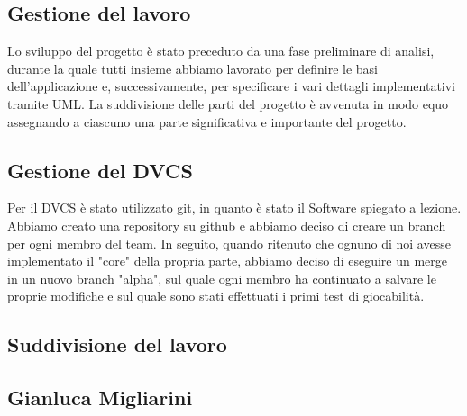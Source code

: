 \documentclass[a4paper,12pt]{report}
\begin{document}
\subsection{Gestione del lavoro}
Lo sviluppo del progetto è stato preceduto da una fase preliminare di analisi, durante la quale tutti insieme abbiamo lavorato per definire le basi dell'applicazione e, successivamente, per specificare i vari dettagli implementativi tramite UML.
La suddivisione delle parti del progetto è avvenuta in modo equo assegnando a ciascuno una parte significativa e importante del progetto.
\subsection*{Gestione del DVCS}
Per il DVCS è stato utilizzato git, in quanto è stato il Software spiegato a lezione. Abbiamo creato una repository su github e abbiamo deciso di creare un branch per ogni membro del team. In seguito, quando ritenuto che ognuno di noi avesse implementato il "core" della propria parte, abbiamo deciso di eseguire un merge in un nuovo branch "alpha", sul quale ogni membro ha continuato a salvare le proprie modifiche e sul quale sono stati effettuati i primi test di giocabilità.
\newpage

\subsection*{Suddivisione del lavoro}
\subsection{Gianluca Migliarini}
\end{document}
